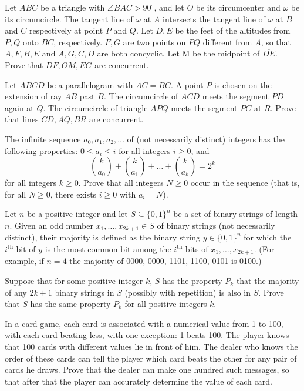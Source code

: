 \documentclass[11pt]{scrartcl}
\begin{document}
\begin{problem}[571373387028298]
Let $ABC$ be a triangle with $\angle BAC > 90 ^{\circ}$, and let $O$ be its circumcenter and $\omega$ be its circumcircle. The tangent line of $\omega$ at $A$ intersects the tangent line of $\omega$ at $B$ and $C$ respectively at point $P$ and $Q$. Let $D,E$ be the feet of the altitudes from $P,Q$ onto $BC$, respectively. $F,G$ are two points on $\overline{PQ}$ different from $A$, so that $A,F,B,E$ and $A,G,C,D$ are both concyclic. Let M be the midpoint of $\overline{DE}$. Prove that $DF,OM,EG$ are concurrent.
\end{problem}
\begin{problem}[4389998719836463980]
Let $ABCD$ be a parallelogram with $AC=BC.$ A point $P$ is chosen on the extension of ray $AB$ past $B.$ The circumcircle of $ACD$ meets the segment $PD$ again at $Q.$ The circumcircle of triangle $APQ$ meets the segment $PC$ at $R.$ Prove that lines $CD,AQ,BR$ are concurrent.
\end{problem}
\begin{problem}[2134021625648303394]
The infinite sequence $a_0,a _1, a_2, \dots$ of (not necessarily distinct) integers has the following properties: $0\le a_i \le i$ for all integers $i\ge 0$, and\[\binom{k}{a_0} + \binom{k}{a_1} + \dots + \binom{k}{a_k} = 2^k\]for all integers $k\ge 0$. Prove that all integers $N\ge 0$ occur in the sequence (that is, for all $N\ge 0$, there exists $i\ge 0$ with $a_i=N$).
\end{problem}
\begin{problem}[648819281604044]
	Let $n$ be a positive integer and let $S \subseteq \{0, 1\}^n$ be a set of binary strings of length $n$. Given an odd number $x_1, \dots, x_{2k + 1} \in S$ of binary strings (not necessarily distinct), their majority is defined as the binary string $y \in \{0, 1\}^n$ for which the $i^{\text{th}}$ bit of $y$ is the most common bit among the $i^{\text{th}}$ bits of $x_1, \dots,x_{2k + 1}$. (For example, if $n = 4$ the majority of 0000, 0000, 1101, 1100, 0101 is 0100.)

Suppose that for some positive integer $k$, $S$ has the property $P_k$ that the majority of any $2k + 1$ binary strings in $S$ (possibly with repetition) is also in $S$. Prove that $S$ has the same property $P_k$ for all positive integers $k$.
\end{problem}
\begin{problem}[4059278924956282558]
In a card game, each card is associated with a numerical value from 1 to 100, with each card beating less, with one exception: 1 beats 100. The player knows that 100 cards with different values lie in front of him. The dealer who knows the order of these cards can tell the player which card beats the other for any pair of cards he draws. Prove that the dealer can make one hundred such messages, so that after that the player can accurately determine the value of each card.
\end{problem}
\end{document}
